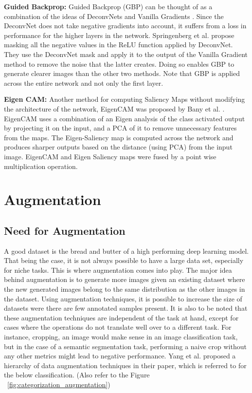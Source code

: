 \textbf{Guided Backprop: } Guided Backprop (GBP) \cite{springenbergStrivingSimplicityAll2015} can be thought of as a combination of the ideas of DeconvNets \cite{zeilerVisualizingUnderstandingConvolutional2013} and Vanilla Gradients \cite{simonyanDeepConvolutionalNetworks2014}. Since the DeconvNet does not take negative gradients into account, it suffers from a loss in performance for the higher layers in the network. Springenberg et al. propose masking all the negative values in the ReLU function applied by DeconvNet. They use the DeconvNet mask and apply it to the output of the Vanilla Gradient method to remove the noise that the latter creates. Doing so enables GBP to generate clearer images than the other two methods. Note that GBP is applied across the entire network and not only the first layer.

\textbf{Eigen CAM: } Another method for computing Saliency Maps without modifying the architecture of the network, EigenCAM was proposed by Bany et al. \cite{banymuhammadEigenCAMVisualExplanations2021}. EigenCAM uses a combination of an Eigen analysis of the class activated output by projecting it on the input, and a PCA of it to remove unnecessary features from the maps. The Eigen-Saliency map is computed across the network and produces sharper outputs based on the distance (using PCA) from the input image. EigenCAM and Eigen Saliency maps were fused by a point wise multiplication operation.

\section{Augmentation} \label{sec:augmentation}
\subsection{Need for Augmentation}

A good dataset is the bread and butter of a high performing deep learning model. That being the case, it is not always possible to have a large data set, especially for niche tasks. This is where augmentation comes into play. The major idea behind augmentation is to generate more images given an existing dataset where the new generated images belong to the same distribution as the other images in the dataset. Using augmentation techniques, it is possible to increase the size of datasets were there are few annotated samples present. It is also to be noted that these augmentation techniques are independent of the task at hand, except for cases where the operations do not translate well over to a different task. For instance, cropping, an image would make sense in an image classification task, but in the case of a semantic segmentation task, performing a naive crop without any other metrics might lead to negative performance. Yang et al. \cite{yangImageDataAugmentation2022} proposed a hierarchy of data augmentation techniques in their paper, which is referred to for the below classification. (Also refer to the Figure ~\ref{fig:categorization_augmentation})

